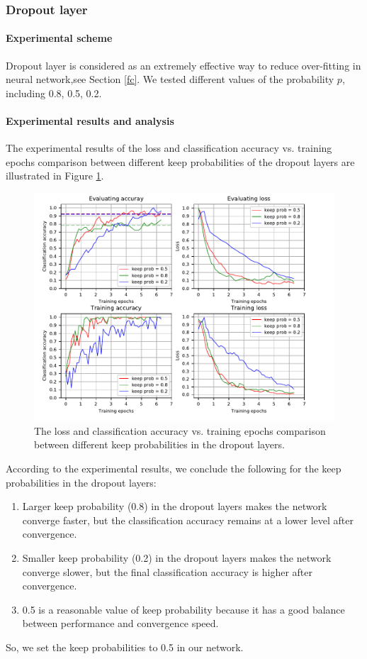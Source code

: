 \subsubsection{Dropout layer}
\paragraph{Experimental scheme}
Dropout layer is considered as an extremely effective way to reduce over-fitting in neural network,see Section \ref{fc}. We tested different values of the probability \(p\), including 0.8, 0.5, 0.2.

\paragraph{Experimental results and analysis}
The experimental results of the loss and classification accuracy vs. training epochs comparison between different keep probabilities of the dropout layers are illustrated in Figure \ref{fig:plot_dropout}.
\begin{figure}
	\includegraphics[trim=0cm 0cm 0cm 0cm]{fig01/plot_dropout.pdf}
	\caption{The loss and classification accuracy vs. training epochs comparison between different keep probabilities in the dropout layers.}
	\label{fig:plot_dropout}
\end{figure}

According to the experimental results, we conclude the following for the keep probabilities in the dropout layers:
\begin{enumerate}
	\item Larger keep probability (0.8) in the dropout layers makes the network converge faster, but the classification accuracy remains at a lower level after convergence.
	\item Smaller keep probability (0.2) in the dropout layers makes the network converge slower, but the final classification accuracy is higher after convergence.
	\item 0.5 is a reasonable value of keep probability because it has a good balance between performance and convergence speed.
\end{enumerate}
So, we set the keep probabilities to 0.5 in our network. 

